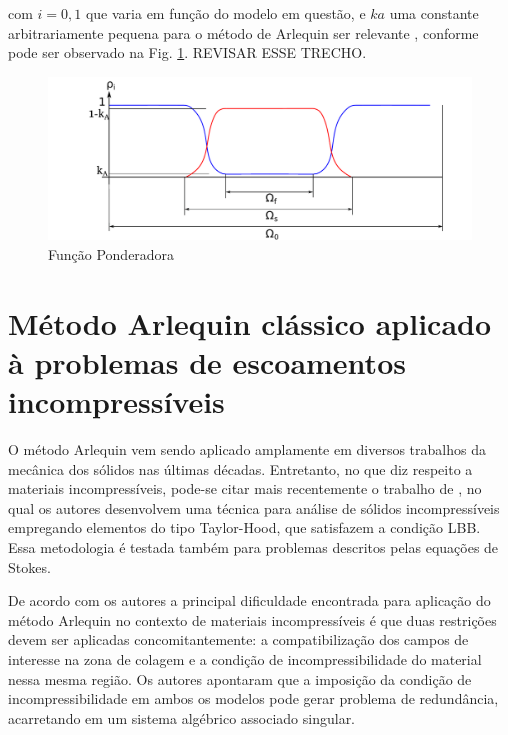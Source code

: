 \documentclass[tese_patricia]{subfiles}
\begin{document}
\noindent com $i=0,1$ que varia em função do modelo em questão, e $ka$ uma constante arbitrariamente pequena para o método de Arlequin ser relevante \cite{Dhia:2008}, conforme pode ser observado na Fig. \ref{fig:constanteKa}. REVISAR ESSE TRECHO.


\begin{figure}[htb!]
	\centering 
	\includegraphics[scale=0.6,trim=0cm 0cm 1.5cm 0.0cm, clip=true]{Imagens/Cap6/ponderadora.pdf}	
	\caption{Função Ponderadora}
	\label{fig:constanteKa}
\end{figure}


\section{Método Arlequin clássico aplicado à problemas de escoamentos incompressíveis}

O método Arlequin vem sendo aplicado amplamente em diversos trabalhos da mecânica dos sólidos nas últimas décadas. Entretanto, no que diz respeito a materiais incompressíveis, pode-se citar mais recentemente o trabalho de , no qual os autores desenvolvem uma técnica para análise de sólidos incompressíveis empregando elementos do tipo Taylor-Hood, que satisfazem a condição LBB. Essa metodologia é testada também para problemas descritos pelas equações de Stokes.

De acordo com os autores  a principal dificuldade encontrada para aplicação do método Arlequin no contexto de materiais incompressíveis é que duas restrições devem ser aplicadas concomitantemente: a compatibilização dos campos de interesse na zona de colagem e a condição de incompressibilidade do material nessa mesma região. Os autores apontaram que a imposição da condição de incompressibilidade em ambos os modelos pode gerar problema de redundância, acarretando em um sistema algébrico associado singular.
\end{document}
